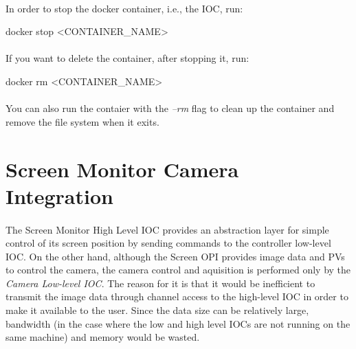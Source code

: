 \documentclass[openany]{article}
\begin{document}
        \paragraph{} In order to stop the docker container, i.e., the IOC, run:

        \vspace{1mm}
        \begin{code}
docker stop <CONTAINER_NAME>
        \end{code}
        \vspace{1mm}

        \paragraph{} If you want to delete the container, after stopping it, run:

        \vspace{1mm}
        \begin{code}
docker rm <CONTAINER_NAME>
        \end{code}
        \vspace{1mm}

        \paragraph{} You can also run the contaier with the \emph{--rm} flag to clean up the container and remove the file system when it exits.

\section{Screen Monitor Camera Integration}\label{sec:dev-reference-frame}

    \paragraph{} The Screen Monitor High Level IOC provides an abstraction layer for simple control of its screen position by sending commands to the controller low-level IOC. On the other hand, although the Screen OPI provides image data and PVs to control the camera, the camera control and aquisition is performed only by the \emph{Camera Low-level IOC}. The reason for it is that it would be inefficient to transmit the image data through channel access to the high-level IOC in order to make it available to the user. Since the data size can be relatively large, bandwidth (in the case where the low and high level IOCs are not running on the same machine) and memory would be wasted.
\end{document}

